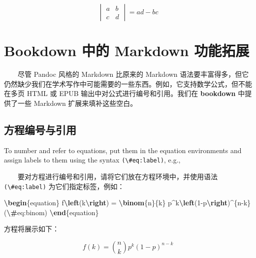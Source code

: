 \documentclass[
  12pt,
]{krantz}
\newenvironment{Shaded}{\begin{snugshade}}{\end{snugshade}}
\newcommand{\ExtensionTok}[1]{#1}
\newcommand{\KeywordTok}[1]{\textcolor[rgb]{0.13,0.29,0.53}{\textbf{#1}}}
\newcommand{\NormalTok}[1]{#1}
\newcommand{\SpecialCharTok}[1]{\textcolor[rgb]{0.81,0.36,0.00}{\textbf{#1}}}
\newcommand{\SpecialStringTok}[1]{\textcolor[rgb]{0.31,0.60,0.02}{#1}}
\theoremstyle{definition}
\theoremstyle{definition}
\theoremstyle{definition}
\theoremstyle{definition}
\theoremstyle{remark}
\begin{document}
\[\begin{vmatrix}a & b\\
c & d
\end{vmatrix}=ad-bc\]

\hypertarget{bookdown-ux4e2dux7684-markdown-ux529fux80fdux62d3ux5c55}{%
\section{Bookdown 中的 Markdown 功能拓展}\label{bookdown-ux4e2dux7684-markdown-ux529fux80fdux62d3ux5c55}}

  尽管 Pandoc 风格的 Markdown 比原来的 Markdown 语法要丰富得多，但它仍然缺少我们在学术写作中可能需要的一些东西。例如，它支持数学公式，但不能在多页 HTML 或 EPUB 输出中对公式进行编号和引用。我们在 \textbf{bookdown} 中提供了一些 Markdown 扩展来填补这些空白。

\hypertarget{equations}{%
\subsection{方程编号与引用}\label{equations}}

To number and refer to equations, put them in the equation environments and assign labels to them using the syntax \texttt{(\textbackslash{}\#eq:label)}, e.g.,

  要对方程进行编号和引用，请将它们放在方程环境中，并使用语法 \texttt{(\textbackslash{}\#eq:label)} 为它们指定标签，例如：

\begin{Shaded}
\begin{Highlighting}[]
\KeywordTok{\textbackslash{}begin}\NormalTok{\{}\ExtensionTok{equation}\NormalTok{\}}\SpecialStringTok{ }
\SpecialStringTok{  f}\SpecialCharTok{\textbackslash{}left}\SpecialStringTok{(k}\SpecialCharTok{\textbackslash{}right}\SpecialStringTok{) = }\SpecialCharTok{\textbackslash{}binom}\SpecialStringTok{\{n\}\{k\} p\^{}k}\SpecialCharTok{\textbackslash{}left}\SpecialStringTok{(1{-}p}\SpecialCharTok{\textbackslash{}right}\SpecialStringTok{)\^{}\{n{-}k\}}
\SpecialStringTok{  (}\SpecialCharTok{\textbackslash{}\#}\SpecialStringTok{eq:binom)}
\KeywordTok{\textbackslash{}end}\NormalTok{\{}\ExtensionTok{equation}\NormalTok{\} }
\end{Highlighting}
\end{Shaded}

方程将展示如下：

\begin{equation}
f\left(k\right)=\binom{n}{k}p^k\left(1-p\right)^{n-k} \label{eq:binom}
\end{equation}
\end{document}
